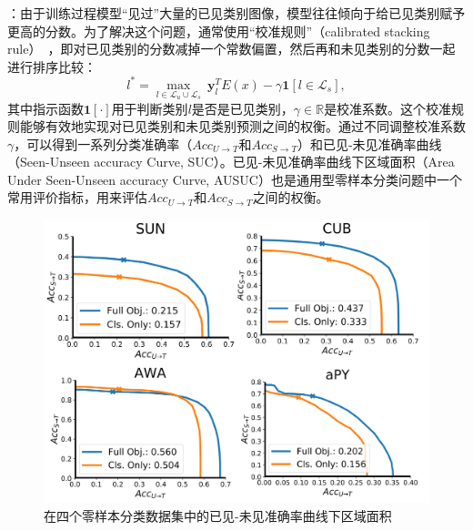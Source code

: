 \textbf{}：由于训练过程模型“见过”大量的已见类别图像，模型往往倾向于给已见类别赋予更高的分数。为了解决这个问题，通常使用“校准规则”（calibrated stacking rule）~\cite{chao2016empirical}，即对已见类别的分数减掉一个常数偏置，然后再和未见类别的分数一起进行排序比较：
\begin{equation} \label{ch3:eq:eq_8}
    l^* = \max_{l\in \mathcal{L}_u \cup \mathcal{L}_s }~\bm{y}^T_l E(x) - \gamma \mathbf{1} \left[ l \in \mathcal{L}_s \right],
\end{equation}
其中指示函数$\mathbf{1} \left[ \cdot \right]$用于判断类别$l$是否是已见类别，$\gamma \in \mathbb{R}$是校准系数。这个校准规则能够有效地实现对已见类别和未见类别预测之间的权衡。通过不同调整校准系数$\gamma$，可以得到一系列分类准确率（$Acc_{U \to T}$和$Acc_{S \to T}$）和已见-未见准确率曲线（Seen-Unseen accuracy Curve, SUC）。已见-未见准确率曲线下区域面积（Area Under Seen-Unseen accuracy Curve, AUSUC）也是通用型零样本分类问题中一个常用评价指标，用来评估$Acc_{U \to T}$和$Acc_{S \to T}$之间的权衡。

\begin{figure}[t]
    \centering
    \includegraphics[width=0.7\linewidth]{chapter3/res/ausuc.pdf}
    \caption{在四个零样本分类数据集中的已见-未见准确率曲线下区域面积}
\label{ch3:fig:ausuc}
\end{figure}


